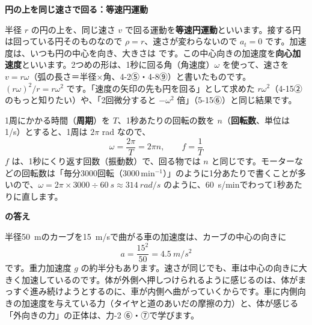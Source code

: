 \noindent\textbf{円の上を同じ速さで回る：等速円運動}\par
\noindent\label{ph:力-1:omega}半径 $r$ の円の上を、同じ速さ $v$ で回る運動を\textbf{等速円運動}といいます。接する円は回っている円そのものなので $\rho=r$、速さが変わらないので $a_t=0$ です。加速度は、いつも円の中心を向き、大きさは
です。この中心向きの加速度を\textbf{向心加速度}といいます。2つめの形は、1秒に回る角（角速度）$\omega$ を使って、速さを $v=r\omega$（弧の長さ＝半径×角、\mbox{4-2⑤}・\mbox{4-8⑨}）と書いたものです。$(r\omega)^2/r=r\omega^2$ です。「速度の矢印の先も円を回る」として求めた $r\omega^2$（\mbox{4-15②}のもっと知りたい）や、「2回微分すると $-\omega^2$ 倍」（5-15⑥）と同じ結果です。

1周にかかる時間（\textbf{周期}）を $T$、1秒あたりの回転の数を $n$（\textbf{回転数}、単位は 1/s）とすると、1周は $2\pi$ rad なので、
\[ \omega=\frac{2\pi}{T}=2\pi n,\qquad f=\frac{1}{T} \]
$f$ は、1秒にくり返す回数（振動数）で、回る物では $n$ と同じです。モーターなどの回転数は「毎分3000回転（3000\,min$^{-1}$）」のように1分あたりで書くことが多いので、$\omega=2\pi\times3000\div\qty{60}{s}\approx\qty{314}{rad/s}$ のように、\qty{60}{s/min}でわって1秒あたりに直します。

\noindent\textbf{\bkhatenaref の答え}\par
\noindent 半径\qty{50}{m}のカーブを\qty{15}{m/s}で曲がる車の加速度は、カーブの中心の向きに
\[ a=\frac{15^2}{50}=\qty{4.5}{m/s^2} \]
です。重力加速度 $g$ の約半分もあります。速さが同じでも、車は中心の向きに大きく加速しているのです。体が外側へ押しつけられるように感じるのは、体がまっすぐ進み続けようとするのに、車が内側へ曲がっていくからです。車に内側向きの加速度を与えている力（タイヤと道のあいだの摩擦の力）と、体が感じる「外向きの力」の正体は、力-2 ⑥・⑦で学びます。

